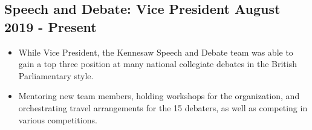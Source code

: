 \documentclass{article}
\begin{document}
\subsection{\large Speech and Debate: Vice President \hfill \small August 2019 - Present}
\begin{itemize}
\setlength\itemsep{.1em}
	\item While Vice President, the Kennesaw Speech and Debate team was able to gain a top three position at many national collegiate debates in the British Parliamentary style. 
	\item  Mentoring new team members, holding workshops for the organization, and orchestrating travel arrangements for the 15 debaters, as well as competing in various competitions.
\end{itemize}
\end{document}
